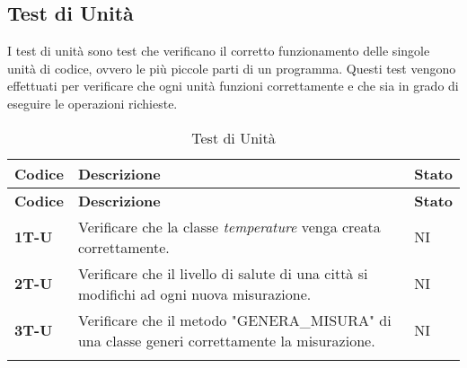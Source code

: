 \subsection{Test di Unità}
I test di unità sono test che verificano il corretto funzionamento delle singole unità di codice, ovvero le più piccole parti di un programma. Questi test vengono effettuati per verificare che ogni unità funzioni correttamente e che sia in grado di eseguire le operazioni richieste. \\
\begin{longtable}{|>{\raggedright\arraybackslash}m{}|>{\raggedright\arraybackslash}m{}|>{\raggedright\arraybackslash}m{}|}
	\hline
	\textbf{Codice} & \textbf{Descrizione}                                                                         & \textbf{Stato} \\
	\hline
	\endfirsthead
	\hline
	\textbf{Codice} & \textbf{Descrizione}                                                                         & \textbf{Stato} \\
	\endhead
	\textbf{1T-U}   & Verificare che la classe \textit{temperature} venga creata correttamente.                    & NI             \\
	\hline
	\textbf{2T-U}   & Verificare che il livello di salute di una città si modifichi ad ogni nuova misurazione.     & NI             \\
	\hline
	\textbf{3T-U}   & Verificare che il metodo "GENERA\_MISURA" di una classe generi correttamente la misurazione. & NI             \\
	\hline
	\caption{Test di Unità}
	\label{table:12}
\end{longtable}

